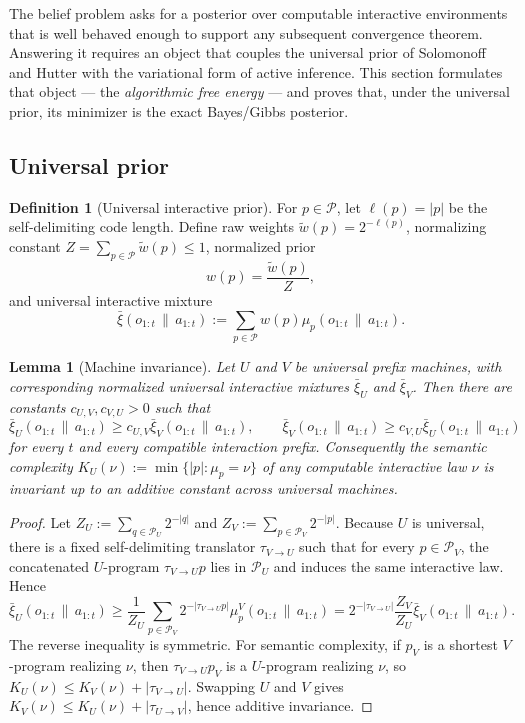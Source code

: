 \documentclass[11pt]{article}
\newtheorem{lemma}[theorem]{Lemma}
\theoremstyle{definition}
\newtheorem{definition}[theorem]{Definition}
\theoremstyle{remark}
\newcommand{\Pcal}{\mathcal{P}}
\newcommand{\givena}{\,\|\,}
\newcommand{\ellp}{\ell}
\newcommand{\wt}{\widetilde}
\newcommand{\barxi}{\bar{\xi}}
\begin{document}
The belief problem asks for a posterior over computable interactive environments that is well behaved enough to support any subsequent convergence theorem. Answering it requires an object that couples the universal prior of Solomonoff and Hutter with the variational form of active inference. This section formulates that object --- the \emph{algorithmic free energy} --- and proves that, under the universal prior, its minimizer is the exact Bayes/Gibbs posterior.

\subsection{Universal prior}

\begin{definition}[Universal interactive prior]
\label{def:universal-prior}
For $p\in\Pcal$, let $\ellp(p)=|p|$ be the self-delimiting code length. Define raw weights $\wt w(p)=2^{-\ellp(p)}$, normalizing constant $Z=\sum_{p\in\Pcal}\wt w(p)\le 1$, normalized prior
\[
w(p)=\frac{\wt w(p)}{Z},
\]
and universal interactive mixture
\[
\barxi(o_{1:t}\givena a_{1:t})
:=
\sum_{p\in\Pcal} w(p)\mu_p(o_{1:t}\givena a_{1:t}).
\]
\end{definition}

\begin{lemma}[Machine invariance]
\label{lem:prior-invariance}
Let $U$ and $V$ be universal prefix machines, with corresponding normalized universal interactive mixtures $\barxi_U$ and $\barxi_V$. Then there are constants $c_{U,V}, c_{V,U}>0$ such that
\[
\barxi_U(o_{1:t}\givena a_{1:t})\ge c_{U,V}\barxi_V(o_{1:t}\givena a_{1:t}),
\qquad
\barxi_V(o_{1:t}\givena a_{1:t})\ge c_{V,U}\barxi_U(o_{1:t}\givena a_{1:t})
\]
for every $t$ and every compatible interaction prefix. Consequently the semantic complexity $K_U(\nu):=\min\{|p|:\mu_p=\nu\}$ of any computable interactive law $\nu$ is invariant up to an additive constant across universal machines.
\end{lemma}

\begin{proof}
Let $Z_U:=\sum_{q\in\Pcal_U}2^{-|q|}$ and $Z_V:=\sum_{p\in\Pcal_V}2^{-|p|}$. Because $U$ is universal, there is a fixed self-delimiting translator $\tau_{V\to U}$ such that for every $p\in\Pcal_V$, the concatenated $U$-program $\tau_{V\to U}p$ lies in $\Pcal_U$ and induces the same interactive law. Hence
\[
\barxi_U(o_{1:t}\givena a_{1:t})
\ge
\frac{1}{Z_U}\sum_{p\in\Pcal_V}2^{-|\tau_{V\to U}p|}\mu_p^V(o_{1:t}\givena a_{1:t})
=
2^{-|\tau_{V\to U}|}\frac{Z_V}{Z_U}\barxi_V(o_{1:t}\givena a_{1:t}).
\]
The reverse inequality is symmetric. For semantic complexity, if $p_V$ is a shortest $V$-program realizing $\nu$, then $\tau_{V\to U}p_V$ is a $U$-program realizing $\nu$, so $K_U(\nu)\le K_V(\nu)+|\tau_{V\to U}|$. Swapping $U$ and $V$ gives $K_V(\nu)\le K_U(\nu)+|\tau_{U\to V}|$, hence additive invariance.
\end{proof}
\end{document}
